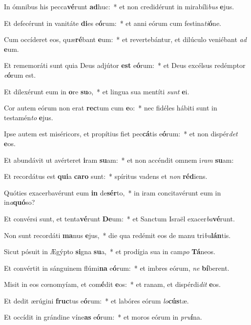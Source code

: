 \item In ómnibus his pecca\textbf{vé}runt \textbf{ad}huc:~* et non credidérunt in mirabíli\textit{bus} \textbf{e}jus.
\item Et defecérunt in vanitáte \textbf{di}es e\textbf{ó}rum:~* et anni eórum cum festina\textit{ti}\textbf{ó}ne.
\item Cum occíderet eos, quæ\textbf{ré}bant \textbf{e}um:~* et revertebántur, et dilúculo veniébant \textit{ad} \textbf{e}um.
\item Et rememoráti sunt quia Deus adjútor \textbf{est} e\textbf{ó}rum:~* et Deus excélsus redémptor \textit{e}\textbf{ó}rum est.
\item Et dilexérunt eum in \textbf{o}re \textbf{su}o,~* et lingua sua mentíti \textit{sunt} \textbf{e}i.
\item Cor autem eórum non erat \textbf{rec}tum cum \textbf{e}o:~* nec fidéles hábiti sunt in testamén\textit{to} \textbf{e}jus.
\item Ipse autem est miséricors, et propítius fiet pec\textbf{cá}tis e\textbf{ó}rum:~* et non dispér\textit{det} \textbf{e}os.
\item Et abundávit ut avérteret \textbf{i}ram \textbf{su}am:~* et non accéndit omnem i\textit{ram} \textbf{su}am:
\item Et recordátus est \textbf{qui}a \textbf{ca}\textbf{ro} sunt:~* spíritus vadens et \textit{non} \textbf{réd}iens.
\item Quóties exacerbavérunt eum \textbf{in} de\textbf{sér}to,~* in iram concitavérunt eum in in\textit{a}\textbf{quó}so?
\item Et convérsi sunt, et tenta\textbf{vé}runt \textbf{De}um:~* et Sanctum Israël exacer\textit{ba}\textbf{vé}runt.
\item Non sunt recordáti \textbf{ma}nus \textbf{e}jus,~* die qua redémit eos de manu tri\textit{bu}\textbf{lán}tis.
\item Sicut pósuit in Ægýpto \textbf{si}gna \textbf{su}a,~* et prodígia sua in cam\textit{po} \textbf{Tá}neos.
\item Et convértit in sánguinem flúmi\textbf{na} e\textbf{ó}rum:~* et imbres eórum, \textit{ne} \textbf{bí}berent.
\item Misit in eos cœnomyíam, et com\textbf{é}dit \textbf{e}os:~* et ranam, et dispérdi\textit{dit} \textbf{e}os.
\item Et dedit ærúgini \textbf{fruc}tus e\textbf{ó}rum:~* et labóres eórum \textit{lo}\textbf{cús}tæ.
\item Et occídit in grándine víne\textbf{as} e\textbf{ó}rum:~* et moros eórum in \textit{pru}\textbf{í}na.
